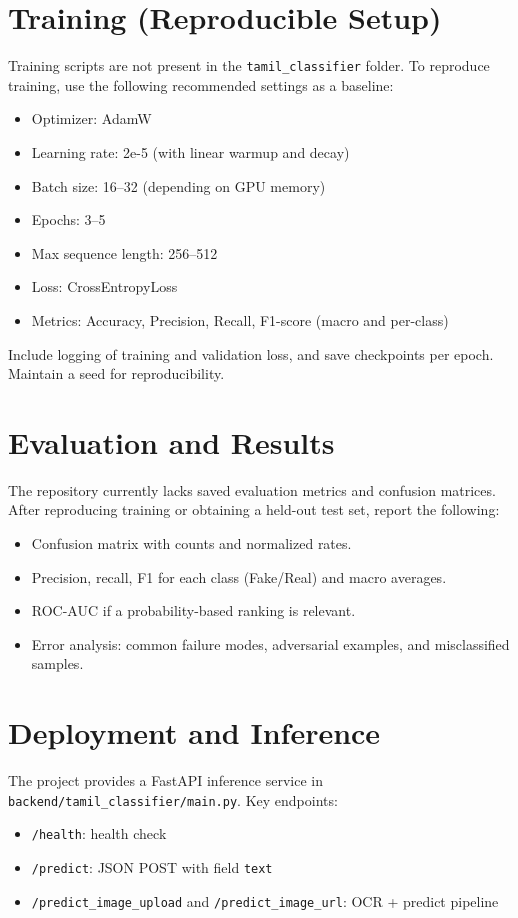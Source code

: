 \documentclass[11pt,a4paper]{article}
\begin{document}
\section{Training (Reproducible Setup)}
Training scripts are not present in the \texttt{tamil_classifier} folder. To reproduce training, use the following recommended settings as a baseline:
\begin{itemize}
  \item Optimizer: AdamW
  \item Learning rate: 2e-5 (with linear warmup and decay)
  \item Batch size: 16--32 (depending on GPU memory)
  \item Epochs: 3--5
  \item Max sequence length: 256--512
  \item Loss: CrossEntropyLoss
  \item Metrics: Accuracy, Precision, Recall, F1-score (macro and per-class)
\end{itemize}

Include logging of training and validation loss, and save checkpoints per epoch. Maintain a seed for reproducibility.

\section{Evaluation and Results}
The repository currently lacks saved evaluation metrics and confusion matrices. After reproducing training or obtaining a held-out test set, report the following:
\begin{itemize}
  \item Confusion matrix with counts and normalized rates.
  \item Precision, recall, F1 for each class (Fake/Real) and macro averages.
  \item ROC-AUC if a probability-based ranking is relevant.
  \item Error analysis: common failure modes, adversarial examples, and misclassified samples.
\end{itemize}

\section{Deployment and Inference}
The project provides a FastAPI inference service in \texttt{backend/tamil_classifier/main.py}. Key endpoints:
\begin{itemize}
  \item \texttt{/health}: health check
  \item \texttt{/predict}: JSON POST with field \texttt{text}
  \item \texttt{/predict_image_upload} and \texttt{/predict_image_url}: OCR + predict pipeline
\end{itemize}
\end{document}
